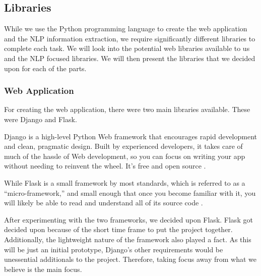 	\subsection{Libraries}
	While we use the Python programming language to create the web application and the NLP information extraction, we require significantly different libraries to complete each task. We will look into the potential web libraries available to us and the NLP focused libraries. We will then present the libraries that we decided upon for each of the parts.
	
	\subsubsection{Web Application}
	For creating the web application, there were two main libraries available. These were Django and Flask.
	
	Django is a high-level Python Web framework that encourages rapid development and clean, pragmatic design. Built by experienced developers, it takes care of much of the hassle of Web development, so you can focus on writing your app without needing to reinvent the wheel. It’s free and open source \cite{django}.
	
	While Flask is a small framework by most standards, which is referred to as a “micro-framework,” and small enough that once you become familiar with it, you will likely be able to read and understand all of its source code \cite{grinberg2018flask}. 
	
	
	
	After experimenting with the two frameworks, we decided upon Flask. Flask got decided upon because of the short time frame to put the project together. Additionally, the lightweight nature of the framework also played a fact. As this will be just an initial prototype, Django's other requirements would be unessential additionals to the project. Therefore, taking focus away from what we believe is the main focus. 
	
